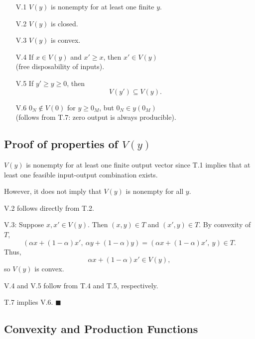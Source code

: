 \begin{itemize}
    \item[V.1] $V(y)$ is nonempty for at least one finite $y$.

    \item[V.2] $V(y)$ is closed.

    \item[V.3] $V(y)$ is convex.

    \item[V.4] If $x \in V(y)$ and $x' \ge x$, then $x' \in V(y)$
    \\(free disposability of inputs).

    \item[V.5] If $y' \ge y \ge 0$, then
    \[
    V(y') \subseteq V(y).
    \]

    \item[V.6] $0_N \notin V(0)$ for $y \ge 0_M$, but $0_N \in y(0_M)$
    \\(follows from T.7: zero output is always producible).
\end{itemize}

\subsection*{Proof of properties of $V(y)$}

$V(y)$ is nonempty for at least one finite output vector since T.1 implies
that at least one feasible input-output combination exists.

However, it does not imply that $V(y)$ is nonempty for all $y$.

\medskip

V.2 follows directly from T.2.

\medskip

V.3: Suppose $x,x' \in V(y)$. Then $(x,y) \in T$ and $(x',y) \in T$.
By convexity of $T$,
\[
(\alpha x + (1-\alpha)x',\ \alpha y + (1-\alpha)y)
=
(\alpha x + (1-\alpha)x',\ y) \in T.
\]
Thus,
\[
\alpha x + (1-\alpha)x' \in V(y),
\]
so $V(y)$ is convex.

\medskip

V.4 and V.5 follow from T.4 and T.5, respectively.

\medskip

T.7 implies V.6. \hfill $\blacksquare$

\subsection*{Convexity and Production Functions}


